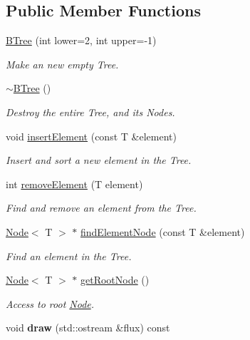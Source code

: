 \subsection*{Public Member Functions}
\begin{DoxyCompactItemize}
\item 
\hyperlink{classBTree_a42fcaa07896d558b3f2e32af0a746eef}{BTree} (int lower=2, int upper=-\/1)
\begin{DoxyCompactList}\small\item\em Make an new empty Tree. \item\end{DoxyCompactList}\item 
\hypertarget{classBTree_a69a20ba2dab56eeb42689731dc9f8db6}{
\hyperlink{classBTree_a69a20ba2dab56eeb42689731dc9f8db6}{$\sim$BTree} ()}
\label{classBTree_a69a20ba2dab56eeb42689731dc9f8db6}

\begin{DoxyCompactList}\small\item\em Destroy the entire Tree, and its Nodes. \item\end{DoxyCompactList}\item 
void \hyperlink{classBTree_a1ed46066240cf460b3464300334c3ef4}{insertElement} (const T \&element)
\begin{DoxyCompactList}\small\item\em Insert and sort a new element in the Tree. \item\end{DoxyCompactList}\item 
int \hyperlink{classBTree_a4db1d4b0380577d46eef1be1186aaf3f}{removeElement} (T element)
\begin{DoxyCompactList}\small\item\em Find and remove an element from the Tree. \item\end{DoxyCompactList}\item 
\hyperlink{classNode}{Node}$<$ T $>$ $\ast$ \hyperlink{classBTree_a34bace4a05a8220358f06d1f4a001eb1}{findElementNode} (const T \&element)
\begin{DoxyCompactList}\small\item\em Find an element in the Tree. \item\end{DoxyCompactList}\item 
\hyperlink{classNode}{Node}$<$ T $>$ $\ast$ \hyperlink{classBTree_a5f3aa12bc8ad8b1e5da1604afab8c8bd}{getRootNode} ()
\begin{DoxyCompactList}\small\item\em Access to root \hyperlink{classNode}{Node}. \item\end{DoxyCompactList}\item 
\hypertarget{classBTree_a80d9f55937c820a6652760a1500413c0}{
void {\bfseries draw} (std::ostream \&flux) const }
\label{classBTree_a80d9f55937c820a6652760a1500413c0}


\end{DoxyCompactItemize}
